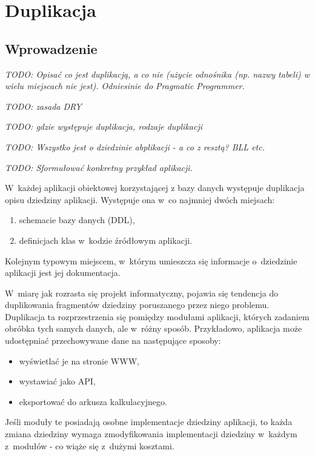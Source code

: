 \chapter{Duplikacja} \label{chap:duplication}

\section{Wprowadzenie}

\emph{TODO: Opisać co jest duplikacją, a co nie (użycie odnośnika (np. nazwy tabeli) w wielu miejscach nie jest). Odniesinie do Pragmatic Programmer.}

\emph{TODO: zasada DRY}

\emph{TODO: gdzie występuje duplikacja, rodzaje duplikacji}

\emph{TODO: Wszystko jest o dziedzinie abplikacji - a co z resztą? BLL etc.}

\emph{TODO: Sformułować konkretny przykład aplikacji.}

W~każdej aplikacji obiektowej korzystającej z bazy danych występuje duplikacja opisu dziedziny aplikacji.
Występuje ona w~co najmniej dwóch miejsach:

\begin{enumerate}
 \item schemacie bazy danych (DDL),
 \item definicjach klas w~kodzie źródłowym aplikacji.
\end{enumerate}

Kolejnym typowym miejscem, w~którym umieszcza się informacje o~dziedzinie aplikacji jest jej dokumentacja.

W~miarę jak rozrasta się projekt informatyczny, pojawia się tendencja do duplikowania fragmentów dziedziny poruszanego przez niego problemu.
Duplikacja ta rozprzestrzenia się pomiędzy modułami aplikacji, których zadaniem obróbka tych samych danych, ale w~różny sposób.
Przykładowo, aplikacja może udostępniać przechowywane dane na następujące sposoby:

\begin{itemize}
 \item wyświetlać je na stronie WWW,
 \item wystawiać jako API,
 \item eksportować do arkusza kalkulacyjnego.
\end{itemize}

Jeśli moduły te posiadają osobne implementacje dziedziny aplikacji, to każda zmiana dziedziny wymaga zmodyfikowania implementacji dziedziny w~każdym z~modułów - co wiąże się z~dużymi kosztami.

